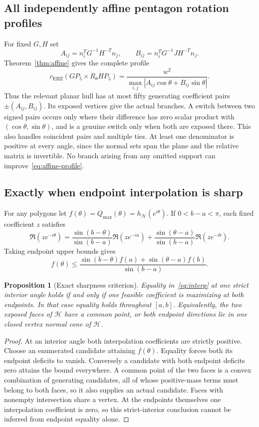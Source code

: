 \documentclass[11pt,a4paper]{article}
\newtheorem{proposition}[theorem]{Proposition}
\theoremstyle{definition}\newtheorem{definition}[theorem]{Definition}
\theoremstyle{remark}\newtheorem{remark}[theorem]{Remark}
\newcommand{\capc}{c_{\mathrm{EHZ}}}
\begin{document}
\subsection{All independently affine pentagon rotation profiles}
For fixed $G,H$ set
\[
 A_{ij}=n_i^TG^{-1}H^{-T}n_j,\qquad
 B_{ij}=n_i^TG^{-1}JH^{-T}n_j.
\]
Theorem~\ref{thm:affine} gives the complete profile
\begin{equation}\label{eq:affine-profile}
 \capc(GP_5\times R_\theta HP_5)
 =\frac{w^2}{\max_{i,j}|A_{ij}\cos\theta+B_{ij}\sin\theta|}.
\end{equation}
Thus the relevant planar hull has at most fifty generating coefficient pairs $\pm(A_{ij},B_{ij})$. Its exposed vertices give the actual branches. A switch between two signed pairs occurs only where their difference has zero scalar product with $(\cos\theta,\sin\theta)$, and is a genuine switch only when both are exposed there. This also handles coincident pairs and multiple ties. At least one denominator is positive at every angle, since the normal sets span the plane and the relative matrix is invertible. No branch arising from any omitted support can improve~\eqref{eq:affine-profile}.

\subsection{Exactly when endpoint interpolation is sharp}
For any polygons let $f(\theta)=Q_{\max}(\theta)=h_{\mathcal H}(e^{i\theta})$. If $0<b-a<\pi$, each fixed coefficient $z$ satisfies
\[
 \Re(ze^{-i\theta})
 =\frac{\sin(b-\theta)}{\sin(b-a)}\Re(ze^{-ia})
 +\frac{\sin(\theta-a)}{\sin(b-a)}\Re(ze^{-ib}).
\]
Taking endpoint upper bounds gives
\begin{equation}\label{eq:interp}
 f(\theta)\le\frac{\sin(b-\theta)f(a)+\sin(\theta-a)f(b)}{\sin(b-a)}.
\end{equation}
\begin{proposition}[Exact sharpness criterion]\label{prop:interpolation}
Equality in~\eqref{eq:interp} at one strict interior angle holds if and only if one feasible coefficient is maximizing at both endpoints. In that case equality holds throughout $[a,b]$. Equivalently, the two exposed faces of $\mathcal H$ have a common point, or both endpoint directions lie in one closed vertex normal cone of $\mathcal H$.
\end{proposition}
\begin{proof}
At an interior angle both interpolation coefficients are strictly positive. Choose an enumerated candidate attaining $f(\theta)$. Equality forces both its endpoint deficits to vanish. Conversely a candidate with both endpoint deficits zero attains the bound everywhere. A common point of the two faces is a convex combination of generating candidates, all of whose positive-mass terms must belong to both faces, so it also supplies an actual candidate. Faces with nonempty intersection share a vertex. At the endpoints themselves one interpolation coefficient is zero, so this strict-interior conclusion cannot be inferred from endpoint equality alone.
\end{proof}
\end{document}
